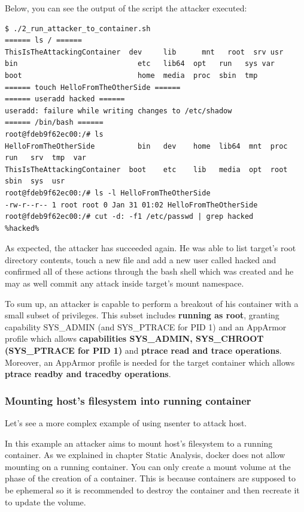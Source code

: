 Below, you can see the output of the script the attacker executed:

\begin{lstlisting}[style=terminal]
$ ./2_run_attacker_to_container.sh 
====== ls / ======
ThisIsTheAttackingContainer  dev     lib	  mnt   root  srv usr
bin                            etc   lib64  opt   run   sys var
boot                           home  media  proc  sbin  tmp
====== touch HelloFromTheOtherSide ======
====== useradd hacked ======
useradd: failure while writing changes to /etc/shadow
====== /bin/bash ======
root@fdeb9f62ec00:/# ls
HelloFromTheOtherSide          bin   dev	home  lib64  mnt  proc	run   srv  tmp	var
ThisIsTheAttackingContainer  boot    etc	lib   media  opt  root	sbin  sys  usr
root@fdeb9f62ec00:/# ls -l HelloFromTheOtherSide 
-rw-r--r-- 1 root root 0 Jan 31 01:02 HelloFromTheOtherSide
root@fdeb9f62ec00:/# cut -d: -f1 /etc/passwd | grep hacked
%hacked%
\end{lstlisting}

As expected, the attacker has succeeded again. He was able to list target's root directory contents, touch a new file and add a new user called hacked and confirmed all of these actions through the bash shell which was created and he may as well commit any attack inside target's mount namespace.
\\
\begin{mdframed}[backgroundcolor=navajowhite]
To sum up, an attacker is capable to perform a breakout of his container with a small subset of privileges. This subset includes \textbf{running as root}, granting capability SYS\_ADMIN (and SYS\_PTRACE for PID 1) and an AppArmor profile which allows \textbf{capabilities SYS\_ADMIN, SYS\_CHROOT (SYS\_PTRACE for PID 1)} and \textbf{ptrace read and trace operations}. 
Moreover, an AppArmor profile is needed for the target container which allows \textbf{ptrace readby and tracedby operations}.
\end{mdframed}

\subsubsection{Mounting host's filesystem into running container}
Let's see a more complex example of using nsenter to attack host. 

In this example an attacker aims to mount host's filesystem to a running container. As we explained in chapter Static Analysis, docker does not allow mounting on a running container. You can only create a mount volume at the phase of the creation of a container. This is because containers are supposed to be ephemeral so it is recommended to destroy the container and then recreate it to update the volume. 

